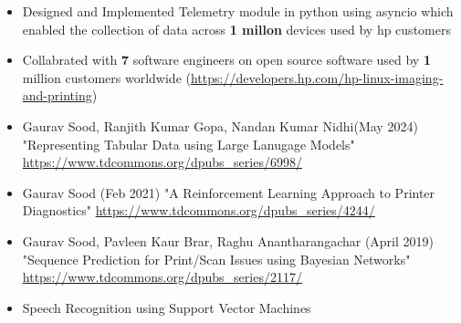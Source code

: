 \documentclass[10pt,a4paper,ragged2e,withhyper]{altacv}
\begin{document}
\begin{paracol}{1}
\par\divider
{}
\begin{itemize}
\item Designed and Implemented Telemetry module in python using asyncio which
enabled the collection of data across \textbf{\textbf{1 millon}} devices used by hp customers
\item Collabrated with \textbf{\textbf{7}} software engineers on open source software used by \textbf{\textbf{1}}
million customers worldwide (\url{https://developers.hp.com/hp-linux-imaging-and-printing})
\end{itemize}


\label{sec:org5e25d88}
\begin{itemize}
\item Gaurav Sood, Ranjith Kumar Gopa, Nandan Kumar Nidhi(May 2024) "Representing
Tabular Data using Large Lanugage Models"
\url{https://www.tdcommons.org/dpubs\_series/6998/}
\item Gaurav Sood (Feb 2021) "A Reinforcement Learning Approach to Printer Diagnostics"
\url{https://www.tdcommons.org/dpubs\_series/4244/}
\item Gaurav	Sood, Pavleen Kaur Brar, Raghu Anantharangachar (April 2019)
"Sequence Prediction for Print/Scan Issues using Bayesian Networks"
\url{https://www.tdcommons.org/dpubs\_series/2117/}
\end{itemize}

\label{sec:org976e920}
\nocite{*}
\printbibliography[heading=pubtype,title={\printinfo{\faUsers}{Conference Proceedings}},type=inproceedings]

\label{sec:org3807439}
\begin{itemize}
\item \faBook Speech Recognition using Support Vector Machines
\end{itemize}

\divider


\end{paracol}
\end{document}
